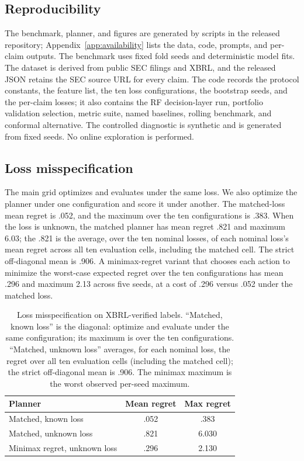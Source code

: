 \documentclass[11pt]{article}
\begin{document}
\subsection{Reproducibility}
The benchmark, planner, and figures are generated by scripts in the released repository; Appendix~\ref{app:availability} lists the data, code, prompts, and per-claim outputs. The benchmark uses fixed fold seeds and deterministic model fits. The dataset is derived from public SEC filings and XBRL, and the released JSON retains the SEC source URL for every claim. The code records the protocol constants, the feature list, the ten loss configurations, the bootstrap seeds, and the per-claim losses; it also contains the RF decision-layer run, portfolio validation selection, metric suite, named baselines, rolling benchmark, and conformal alternative. The controlled diagnostic is synthetic and is generated from fixed seeds. No online exploration is performed.

\subsection{Loss misspecification}
\label{app:cross}
The main grid optimizes and evaluates under the same loss. We also optimize the planner under one configuration and score it under another. The matched-loss mean regret is .052, and the maximum over the ten configurations is .383. When the loss is unknown, the matched planner has mean regret .821 and maximum 6.03; the .821 is the average, over the ten nominal losses, of each nominal loss's mean regret across all ten evaluation cells, including the matched cell. The strict off-diagonal mean is .906. A minimax-regret variant that chooses each action to minimize the worst-case expected regret over the ten configurations has mean .296 and maximum 2.13 across five seeds, at a cost of .296 versus .052 under the matched loss.

\begin{table}[t]
\centering
\small
\setlength{\tabcolsep}{4pt}
\begin{tabular}{lcc}
\toprule
Planner & Mean regret & Max regret \\
\midrule
Matched, known loss & .052 & .383 \\
Matched, unknown loss & .821 & 6.030 \\
Minimax regret, unknown loss & .296 & 2.130 \\
\bottomrule
\end{tabular}
\caption{Loss misspecification on XBRL-verified labels. ``Matched, known loss'' is the diagonal: optimize and evaluate under the same configuration; its maximum is over the ten configurations. ``Matched, unknown loss'' averages, for each nominal loss, the regret over all ten evaluation cells (including the matched cell); the strict off-diagonal mean is .906. The minimax maximum is the worst observed per-seed maximum.}
\label{tab:cross}
\end{table}
\end{document}
